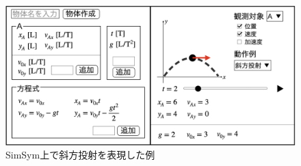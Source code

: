 \documentclass[11pt, a4paper, oneside, twocolumn, dvipdfmx]{jsarticle}
\newcommand{\simname}{SimSym}
\begin{document}
\begin{figure}[htb]
  \centering
  \includegraphics*[width=\linewidth]{work/slide_img5-crop.png}
  \caption{\simname 上で斜方投射を表現した例} \label{simsym_fig1}
\end{figure}
\end{document}
